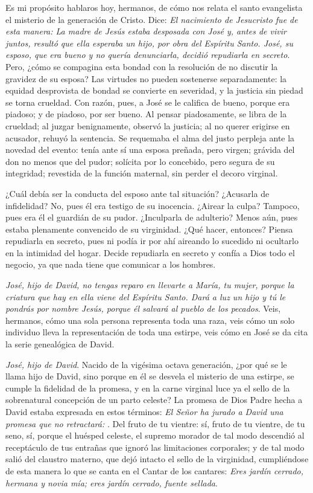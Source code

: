 			\begin{body}
				Es mi propósito hablaros hoy, hermanos, de cómo nos relata el santo evangelista el misterio de la generación de Cristo. Dice: \emph{El nacimiento de Jesucristo fue de esta manera: La madre de Jesús estaba desposada con José y, antes de vivir juntos, resultó que ella esperaba un hijo, por obra del Espíritu Santo. José, su esposo, que era bueno y no quería denunciarla, decidió repudiarla en secreto}. Pero, ¿cómo se compagina esta bondad con la resolución de no discutir la gravidez de su esposa? Las virtudes no pueden sostenerse separadamente: la equidad desprovista de bondad se convierte en severidad, y la justicia sin piedad se torna crueldad. Con razón, pues, a José se le califica de bueno, porque era piadoso; y de piadoso, por ser bueno. Al pensar piadosamente, se libra de la crueldad; al juzgar benignamente, observó la justicia; al no querer erigirse en acusador, rehuyó la sentencia. Se requemaba el alma del justo perpleja ante la novedad del evento: tenía ante sí una esposa preñada, pero virgen; grávida del don no menos que del pudor; solícita por lo concebido, pero segura de su integridad; revestida de la función maternal, sin perder el decoro virginal.
				
				¿Cuál debía ser la conducta del esposo ante tal situación? ¿Acusarla de infidelidad? No, pues él era testigo de su inocencia. ¿Airear la culpa? Tampoco, pues era él el guardián de su pudor. ¿Inculparla de adulterio? Menos aún, pues estaba plenamente convencido de su virginidad. ¿Qué hacer, entonces? Piensa repudiarla en secreto, pues ni podía ir por ahí aireando lo sucedido ni ocultarlo en la intimidad del hogar. Decide repudiarla en secreto y confía a Dios todo el negocio, ya que nada tiene que comunicar a los hombres.
				
				\emph{José, hijo de David, no tengas reparo en llevarte a María, tu mujer, porque la criatura que hay en ella viene del Espíritu Santo. Dará a luz un hijo y tú le pondrás por nombre Jesús, porque él salvará al pueblo de los pecados}. Veis, hermanos, cómo una sola persona representa toda una raza, veis cómo un solo individuo lleva la representación de toda una estirpe, veis cómo en José se da cita la serie genealógica de David.
				
				\emph{José, hijo de David}. Nacido de la vigésima octava generación, ¿por qué se le llama hijo de David, sino porque en él se desvela el misterio de una estirpe, se cumple la fidelidad de la promesa, y en la carne virginal luce ya el sello de la sobrenatural concepción de un parto celeste? La promesa de Dios Padre hecha a David estaba expresada en estos términos: \emph{El Señor ha jurado a David una promesa que no retractará: }. Del fruto de tu vientre: sí, fruto de tu vientre, de tu seno, sí, porque el huésped celeste, el supremo morador de tal modo descendió al receptáculo de tus entrañas que ignoró las limitaciones corporales; y de tal modo salió del claustro materno, que dejó intacto el sello de la virginidad, cumpliéndose de esta manera lo que se canta en el Cantar de los cantares: \emph{Eres jardín cerrado, hermana y novia mía; eres jardín cerrado, fuente sellada}.
				

\end{body}
